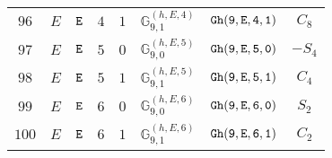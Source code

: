 \documentclass[fleqn,8pt]{jsarticle}
\begin{document}
\begin{table}[ht!]
\begin{center}
\begin{tabular}{cccccccc}
$ 96 $ & $ E $ & $ {\tt E} $ & $ 4 $ & $ 1 $ & $ \mathbb{G}_{9,1}^{(h,E,4)} $ & $ {\tt Gh(9,E,4,1)} $ & $ C_{8} $ \\
$ 97 $ & $ E $ & $ {\tt E} $ & $ 5 $ & $ 0 $ & $ \mathbb{G}_{9,0}^{(h,E,5)} $ & $ {\tt Gh(9,E,5,0)} $ & $ - S_{4} $ \\
$ 98 $ & $ E $ & $ {\tt E} $ & $ 5 $ & $ 1 $ & $ \mathbb{G}_{9,1}^{(h,E,5)} $ & $ {\tt Gh(9,E,5,1)} $ & $ C_{4} $ \\
$ 99 $ & $ E $ & $ {\tt E} $ & $ 6 $ & $ 0 $ & $ \mathbb{G}_{9,0}^{(h,E,6)} $ & $ {\tt Gh(9,E,6,0)} $ & $ S_{2} $ \\
$ 100 $ & $ E $ & $ {\tt E} $ & $ 6 $ & $ 1 $ & $ \mathbb{G}_{9,1}^{(h,E,6)} $ & $ {\tt Gh(9,E,6,1)} $ & $ C_{2} $ \\
 \hline \hline
\end{tabular}
\end{center}
\end{table}
\end{document}
